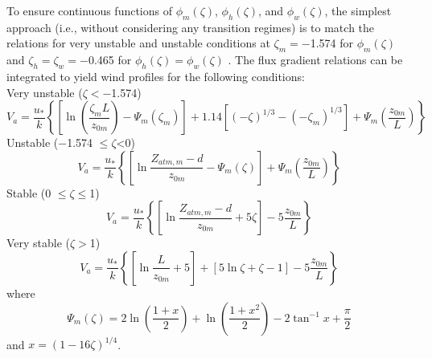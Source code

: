 \documentclass[12pt,authoryear]{elsarticle}
\numberwithin{equation}{section} %
\begin{document}
To ensure continuous functions of $\phi_m({\zeta})$, $\phi_{h}(\zeta)$, and $\phi_{w}(\zeta)$, the simplest approach
(i.e., without considering any transition regimes) is to match the relations for very unstable and unstable conditions at $\zeta_{m}=-$1.574 for $\phi_{m}(\zeta)$ and $\zeta_{h}=\zeta_{w}=-$0.465 for $\phi_{h}(\zeta)=\phi_{w}(\zeta)$ \citep{zengIntercomparisonBulkAerodynamic1998}. The flux gradient relations can be integrated to yield wind profiles for the following conditions:\\
Very unstable ($\zeta<-$1.574)
\begin{equation}
\label{eq:wind_profile_very_unstable}
V_a=\frac{u_*}{k}
\left\{
\left[
\ln\left(\frac{\zeta_m L}{z_{0m}}\right)-\Psi_m(\zeta_m)
\right] + 1.14\left[(-\zeta)^{1/3}-(-\zeta_m)^{1/3}
\right] + \Psi_{m}\left(\frac{z_{0m}}{L}\right)
\right\}
\end{equation}
Unstable ($-$1.574 $\leq \zeta$<0)
\begin{equation}
V_{a}=\frac{u_*}{k}\left\{\left[\ln \frac{Z_{atm,m}-d}{z_{0m}}-\Psi_{m}(\zeta)\right]+\Psi_{m}\left(\frac{z_{0m}}{L}\right)\right\}
\end{equation}
Stable (0 $\leq \zeta \leq$1)
\begin{equation}
V_{a}=\frac{u_*}{k}\left\{\left[\ln \frac{Z_{atm,m}-d}{z_{0m}}+5\zeta\right]-5\frac{z_{0m}}{L}\right\}
\end{equation}
Very stable ($\zeta>$1)
\begin{equation}
\label{eq:wind_profile_very_stable}
V_{a}= \frac{u_*}{k}\left\{\left[\ln \frac{L}{z_{0m}}+5\right]+\left[5\ln\zeta+\zeta-1\right]-5\frac{z_{0m}}{L}\right\}
\end{equation}
where
\begin{equation}
\Psi_{m}(\zeta)=2\ln\left(\frac{1+x}{2}\right)+\ln\left(\frac{1+x^2}{2}\right)-2\tan^{-1}x+\frac{\pi}{2}
\end{equation}
and $x=(1-16\zeta)^{1/4}$. 
\end{document}
